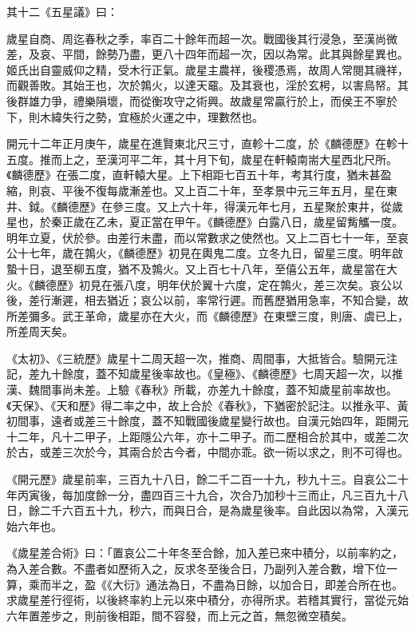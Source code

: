 \begin{pinyinscope}
 其十二《五星議》曰：



 歲星自商、周迄春秋之季，率百二十餘年而超一次。戰國後其行浸急，至漢尚微差，及哀、平間，餘勢乃盡，更八十四年而超一次，因以為常。此其與餘星異也。姬氏出自靈威仰之精，受木行正氣。歲星主農祥，後稷憑焉，故周人常閱其禨祥，而觀善敗。其始王也，次於鶉火，以達天黿。及其衰也，淫於玄枵，以害鳥帑。其後群雄力爭，禮樂隕壞，而從衡攻守之術興。故歲星常贏行於上，而侯王不寧於下，則木緯失行之勢，宜極於火運之中，理數然也。



 開元十二年正月庚午，歲星在進賢東北尺三寸，直軫十二度，於《麟德歷》在軫十五度。推而上之，至漢河平二年，其十月下旬，歲星在軒轅南耑大星西北尺所。《麟德歷》在張二度，直軒轅大星。上下相距七百五十年，考其行度，猶未甚盈縮，則哀、平後不復每歲漸差也。又上百二十年，至孝景中元三年五月，星在東井、鉞。《麟德歷》在參三度。又上六十年，得漢元年七月，五星聚於東井，從歲星也，於秦正歲在乙未，夏正當在甲午。《麟德歷》白露八日，歲星留觜觿一度。明年立夏，伏於參。由差行未盡，而以常數求之使然也。又上二百七十一年，至哀公十七年，歲在鶉火，《麟德歷》初見在輿鬼二度。立冬九日，留星三度。明年啟蟄十日，退至柳五度，猶不及鶉火。又上百七十八年，至僖公五年，歲星當在大火。《麟德歷》初見在張八度，明年伏於翼十六度，定在鶉火，差三次矣。哀公以後，差行漸遲，相去猶近；哀公以前，率常行遲。而舊歷猶用急率，不知合變，故所差彌多。武王革命，歲星亦在大火，而《麟德歷》在東壁三度，則唐、虞已上，所差周天矣。



 《太初》、《三統歷》歲星十二周天超一次，推商、周間事，大抵皆合。驗開元注記，差九十餘度，蓋不知歲星後率故也。《皇極》、《麟德歷》七周天超一次，以推漢、魏間事尚未差。上驗《春秋》所載，亦差九十餘度，蓋不知歲星前率故也。《天保》、《天和歷》得二率之中，故上合於《春秋》，下猶密於記注。以推永平、黃初間事，遠者或差三十餘度，蓋不知戰國後歲星變行故也。自漢元始四年，距開元十二年，凡十二甲子，上距隱公六年，亦十二甲子。而二歷相合於其中，或差二次於古，或差三次於今，其兩合於古今者，中間亦乖。欲一術以求之，則不可得也。



 《開元歷》歲星前率，三百九十八日，餘二千二百一十九，秒九十三。自哀公二十年丙寅後，每加度餘一分，盡四百三十九合，次合乃加秒十三而止，凡三百九十八日，餘二千六百五十九，秒六，而與日合，是為歲星後率。自此因以為常，入漢元始六年也。



 《歲星差合術》曰：「置哀公二十年冬至合餘，加入差已來中積分，以前率約之，為入差合數。不盡者如歷術入之，反求冬至後合日，乃副列入差合數，增下位一算，乘而半之，盈《《大衍》通法為日，不盡為日餘，以加合日，即差合所在也。求歲星差行徑術，以後終率約上元以來中積分，亦得所求。若稽其實行，當從元始六年置差步之，則前後相距，間不容發，而上元之首，無忽微空積矣。




\end{pinyinscope}
